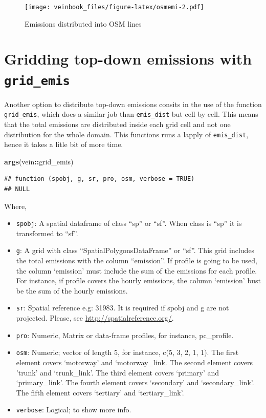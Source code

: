 \documentclass[12pt,graybox,envcountchap,sectrefs]{krantz}
\makeatletter
\newenvironment{Shaded}{\begin{snugshade}}{\end{snugshade}}
\newcommand{\KeywordTok}[1]{\textcolor[rgb]{0.13,0.29,0.53}{\textbf{#1}}}
\newcommand{\OperatorTok}[1]{\textcolor[rgb]{0.81,0.36,0.00}{\textbf{#1}}}
\newcommand{\NormalTok}[1]{#1}
\providecommand{\tightlist}{%
  \setlength{\itemsep}{0pt}\setlength{\parskip}{0pt}}
\newenvironment{kframe}{%
\medskip{}
\setlength{\fboxsep}{.8em}
 \def\at@end@of@kframe{}%
 \ifinner\ifhmode%
  \def\at@end@of@kframe{\end{minipage}}%
  \begin{minipage}{\columnwidth}%
 \fi\fi%
 \def\FrameCommand##1{\hskip\@totalleftmargin \hskip-\fboxsep
 \colorbox{shadecolor}{##1}\hskip-\fboxsep
     \hskip-\linewidth \hskip-\@totalleftmargin \hskip\columnwidth}%
 \MakeFramed {\advance\hsize-\width
   \@totalleftmargin\z@ \linewidth\hsize
   \@setminipage}}%
 {\par\unskip\endMakeFramed%
 \at@end@of@kframe}
\renewenvironment{Shaded}{\begin{kframe}}{\end{kframe}}
\theoremstyle{definition}
\theoremstyle{definition}
\theoremstyle{definition}
\theoremstyle{remark}
\makeatother
\begin{document}
\begin{figure}
\centering
\texttt{[image: veinbook\_files/figure-latex/osmemi-2.pdf]}
\caption{\label{fig:osmemi}Emissions distributed into OSM lines}
\end{figure}

\section{\texorpdfstring{Gridding top-down emissions with
\texttt{grid\_emis}}{Gridding top-down emissions with grid\_emis}}\label{gridding-top-down-emissions-with-grid_emis}

Another option to distribute top-down emissions consits in the use of
the function \texttt{grid\_emis}, which does a similar job than
\texttt{emis\_dist} but cell by cell. This means that the total
emissions are distributed inside each grid cell and not one distribution
for the whole domain. This functions runs a lapply of
\texttt{emis\_dist}, hence it takes a litle bit of more time.

\begin{Shaded}
\begin{Highlighting}[]
\KeywordTok{args}\NormalTok{(vein}\OperatorTok{::}\NormalTok{grid_emis)}
\end{Highlighting}
\end{Shaded}

\begin{verbatim}
## function (spobj, g, sr, pro, osm, verbose = TRUE) 
## NULL
\end{verbatim}

Where,

\begin{itemize}
\tightlist
\item
  \texttt{spobj}: A spatial dataframe of class ``sp'' or ``sf''. When
  class is ``sp'' it is transformed to ``sf''.
\item
  \texttt{g}: A grid with class ``SpatialPolygonsDataFrame'' or ``sf''.
  This grid includes the total emissions with the column ``emission''.
  If profile is going to be used, the column `emission' must include the
  sum of the emissions for each profile. For instance, if profile covers
  the hourly emissions, the column `emission' bust be the sum of the
  hourly emissions.
\item
  \texttt{sr}: Spatial reference e.g: 31983. It is required if spobj and
  g are not projected. Please, see \url{http://spatialreference.org/}.
\item
  \texttt{pro}: Numeric, Matrix or data-frame profiles, for instance,
  pc\_profile.
\item
  \texttt{osm}: Numeric; vector of length 5, for instance, c(5, 3, 2, 1,
  1). The first element covers `motorway' and `motorway\_link. The
  second element covers 'trunk' and `trunk\_link'. The third element
  covers `primary' and `primary\_link'. The fourth element covers
  `secondary' and `secondary\_link'. The fifth element covers `tertiary'
  and `tertiary\_link'.
\item
  \texttt{verbose}: Logical; to show more info.
\end{itemize}
\end{document}
